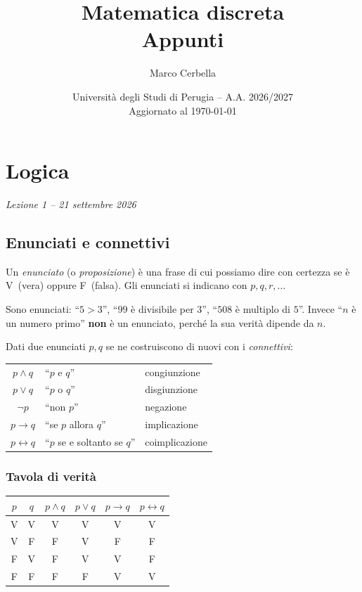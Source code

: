 \documentclass[11pt,a4paper]{article}
\title{Matematica discreta\\[0.4em]\large Appunti}
\author{Marco Cerbella}
\date{Università degli Studi di Perugia -- A.A. 2026/2027\\ Aggiornato al \today}
\newcommand{\V}{\textsf{V}}
\newcommand{\F}{\textsf{F}}
\begin{document}
\maketitle
\setcounter{tocdepth}{1}
\tableofcontents
\clearpage

\section[Logica (Lezione 1 -- 21 settembre 2026)]{Logica}
\noindent\emph{Lezione 1 -- 21 settembre 2026}
\subsection{Enunciati e connettivi}

\begin{definizione}
Un \emph{enunciato} (o \emph{proposizione}) è una frase di cui possiamo
dire con certezza se è \V\ (vera) oppure \F\ (falsa). Gli enunciati si
indicano con $p, q, r, \dots$
\end{definizione}

\begin{esempio}
Sono enunciati: ``$5 > 3$'', ``$99$ è divisibile per $3$'',
``$508$ è multiplo di $5$''. Invece ``$n$ è un numero primo'' \textbf{non}
è un enunciato, perché la sua verità dipende da $n$.
\end{esempio}

Dati due enunciati $p, q$ se ne costruiscono di nuovi con i
\emph{connettivi}:
\begin{center}
\begin{tabular}{cll}
$p \land q$ & ``$p$ e $q$'' & congiunzione \\
$p \lor q$ & ``$p$ o $q$'' & disgiunzione \\
$\neg p$ & ``non $p$'' & negazione \\
$p \to q$ & ``se $p$ allora $q$'' & implicazione \\
$p \leftrightarrow q$ & ``$p$ se e soltanto se $q$'' & coimplicazione
\end{tabular}
\end{center}

\subsubsection*{Tavola di verità}

\begin{center}
\begin{tabular}{cc|c|c|c|c}
$p$ & $q$ & $p \land q$ & $p \lor q$ & $p \to q$ & $p \leftrightarrow q$ \\ \hline
\V & \V & \V & \V & \V & \V \\
\V & \F & \F & \V & \F & \F \\
\F & \V & \F & \V & \V & \F \\
\F & \F & \F & \F & \V & \V
\end{tabular}
\end{center}
\end{document}
